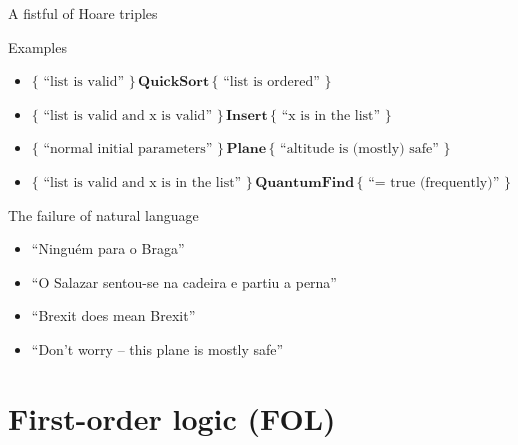 \documentclass[aspectratio=169]{beamer}
\newenvironment{mexamples}
  {\begin{exampleblock}{Examples}}
  {\end{exampleblock}}
\begin{document}
\begin{frame}{A fistful of Hoare triples}
       
        \begin{mexamples}
        \begin{itemize} 
                \item $\{ \text{ ``list is valid'' } \} 
                      \, \mathbf{QuickSort} \, 
                      \{ \text{ ``list is ordered'' } \}$
                \item $\{ \text{ ``list is valid and x is valid'' } \}
                      \, \mathbf{Insert} \, 
                      \{ \text{ ``x is in the list'' } \}$
                \item $\{ \text{ ``normal initial parameters'' } \} 
                      \, \mathbf{Plane} \, 
                      \{ \text{ ``altitude is (mostly) safe'' } \}$
                \item $\{ \text{ ``list is valid and x is in the list'' } \} 
                        \, \mathbf{QuantumFind} \, 
                      \{ \text{ ``= true (frequently)'' } \}$
        \end{itemize}
        \end{mexamples}
        \pause
        \vspace{0.5cm}
        \begin{center}
        \end{center}
\end{frame}

\begin{frame}{The failure of natural language}

        \begin{itemize}
                \item ``Ninguém para o Braga''
                \item ``O Salazar sentou-se na cadeira e partiu a perna''
                \item ``Brexit does mean Brexit''
                \item ``Don't worry -- this plane is mostly safe''
        \end{itemize}
\end{frame}

\section{First-order logic (FOL)}
\end{document}
